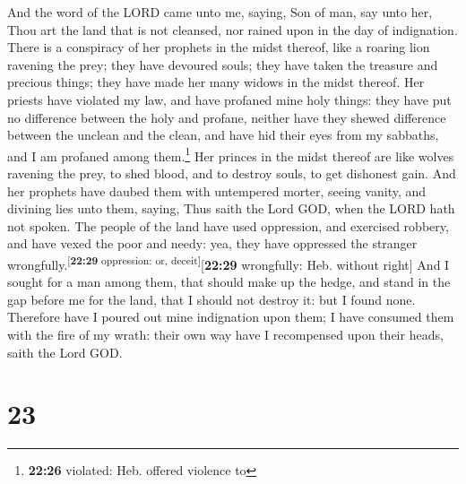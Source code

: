  And the word of the LORD came unto me, saying,
 Son of man, say unto her, Thou art the land that is not
cleansed, nor rained upon in the day of indignation. 
There is a conspiracy of her prophets in the midst thereof, like a
roaring lion ravening the prey; they have devoured souls; they have
taken the treasure and precious things; they have made her many widows
in the midst thereof.  Her priests have violated my law,
and have profaned mine holy things: they have put no difference between
the holy and profane, neither have they shewed difference between the
unclean and the clean, and have hid their eyes from my sabbaths, and I
am profaned among them.\footnote{\textbf{22:26} violated: Heb. offered
  violence to}  Her princes in the midst thereof are like
wolves ravening the prey, to shed blood, and to destroy souls, to get
dishonest gain.  And her prophets have daubed them with
untempered morter, seeing vanity, and divining lies unto them, saying,
Thus saith the Lord GOD, when the LORD hath not spoken. 
The people of the land have used oppression, and exercised robbery, and
have vexed the poor and needy: yea, they have oppressed the stranger
wrongfully.\textsuperscript{{[}\textbf{22:29} oppression: or,
deceit{]}}{[}\textbf{22:29} wrongfully: Heb. without right{]}
 And I sought for a man among them, that should make up
the hedge, and stand in the gap before me for the land, that I should
not destroy it: but I found none.  Therefore have I
poured out mine indignation upon them; I have consumed them with the
fire of my wrath: their own way have I recompensed upon their heads,
saith the Lord GOD.

\hypertarget{section-22}{%
\section{23}\label{section-22}}

